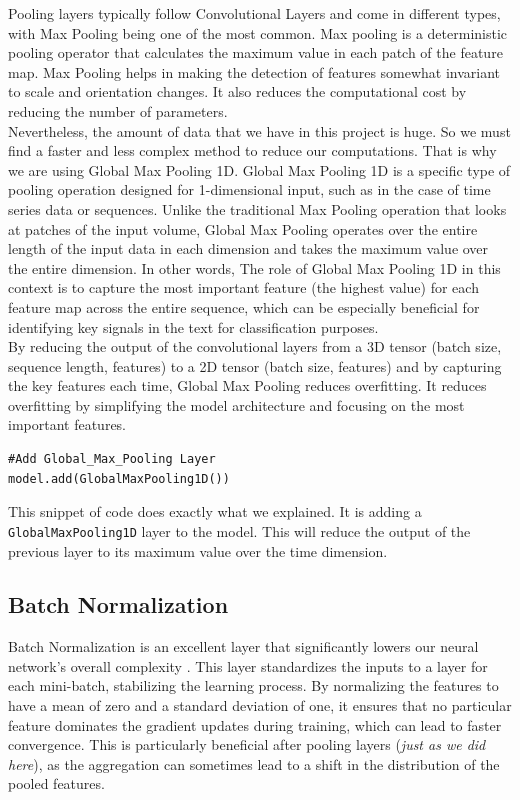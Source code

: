 Pooling layers typically follow Convolutional Layers and come in different types, with Max Pooling being one of the most common. Max pooling is a deterministic pooling operator that calculates the maximum value in each patch of the feature map. Max Pooling helps in making the detection of features somewhat invariant to scale and orientation changes. It also reduces the computational cost by reducing the number of parameters.\\

Nevertheless, the amount of data that we have in this project is huge. So we must find a faster and less complex method to reduce our computations. That is why we are using Global Max Pooling 1D. Global Max Pooling 1D is a specific type of pooling operation designed for 1-dimensional input, such as in the case of time series data or sequences. Unlike the traditional Max Pooling operation that looks at patches of the input volume, Global Max Pooling operates over the entire length of the input data in each dimension and takes the maximum value over the entire dimension. In other words, The role of Global Max Pooling 1D in this context is to capture the most important feature (the highest value) for each feature map across the entire sequence, which can be especially beneficial for identifying key signals in the text for classification purposes.\\
By reducing the output of the convolutional layers from a 3D tensor (batch size, sequence length, features) to a 2D tensor (batch size, features) and by capturing the key features each time, Global Max Pooling reduces overfitting. It reduces overfitting by simplifying the model architecture and focusing on the most important features.\\

\begin{lstlisting}
#Add Global_Max_Pooling Layer
model.add(GlobalMaxPooling1D())
\end{lstlisting}

This snippet of code does exactly what we explained. It is adding a \verb*|GlobalMaxPooling1D| layer to the model. This will reduce the output of the previous layer to its maximum value over the time dimension.


\subsection{Batch Normalization}
Batch Normalization is an excellent layer that significantly lowers our neural network's overall complexity \cite{ioffe2015batch}.
This layer standardizes the inputs to a layer for each mini-batch, stabilizing the learning process. By normalizing the features to have a mean of zero and a standard deviation of one, it ensures that no particular feature dominates the gradient updates during training, which can lead to faster convergence. This is particularly beneficial after pooling layers (\textit{just as we did here}), as the aggregation can sometimes lead to a shift in the distribution of the pooled features.

